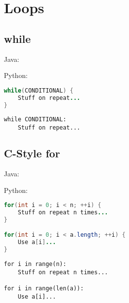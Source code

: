 \documentclass{article}
\begin{document}
\section{Loops}
\subsection{while}
\begin{minipage}{0.45\linewidth}
    Java:
\end{minipage}
\hfill
\begin{minipage}{0.45\linewidth}
    Python:
\end{minipage}

\begin{minipage}{0.45\linewidth}
    \begin{lstlisting}[language=Java]
while(CONDITIONAL) {
    Stuff on repeat...
}
    \end{lstlisting}
\end{minipage}
\hfill
\begin{minipage}{0.45\linewidth}
    \begin{lstlisting}
while CONDITIONAL:
    Stuff on repeat...
    \end{lstlisting}
\end{minipage}

\subsection{C-Style for}
\begin{minipage}{0.45\linewidth}
    Java:
\end{minipage}
\hfill
\begin{minipage}{0.45\linewidth}
    Python:
\end{minipage}

\begin{minipage}{0.45\linewidth}
    \begin{lstlisting}[language=Java]
for(int i = 0; i < n; ++i) {
    Stuff on repeat n times...
}

for(int i = 0; i < a.length; ++i) {
    Use a[i]...
}
    \end{lstlisting}
\end{minipage}
\hfill
\begin{minipage}{0.45\linewidth}
    \begin{lstlisting}
for i in range(n):
    Stuff on repeat n times...

for i in range(len(a)):
    Use a[i]...
    \end{lstlisting}
\end{minipage}
\end{document}
